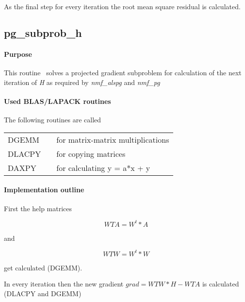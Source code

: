 \documentclass[a4paper,10pt]{scrartcl}
\begin{document}
					As the final step for every iteration the root mean square residual is
					calculated.\newline


		\subsection{pg\_subprob\_h}


			\paragraph{Purpose}


				
					This routine~\cite{lin2007} solves a projected gradient subproblem for calculation of  the next iteration of \emph{H} as required by \emph{nmf\_alspg} and \emph{nmf\_pg} \newline


			\paragraph{Used BLAS/LAPACK routines}

					The following routines are called\newline

					\begin{tabular}{lcl}
						DGEMM && for matrix-matrix multiplications\\
						DLACPY && for copying matrices\\
						DAXPY && for calculating y = a*x + y\\
					\end{tabular}

			\paragraph{Implementation outline}


					First the help matrices

					\begin{equation*}
						WTA = W^t * A
					\end{equation*}

					and
	
					\begin{equation*}
 						WTW = W^t * W
					\end{equation*}

					get calculated (DGEMM).\newline


					In every iteration then the new gradient $grad = WTW*H - WTA$ is
					calculated (DLACPY and DGEMM)\newline
\end{document}

